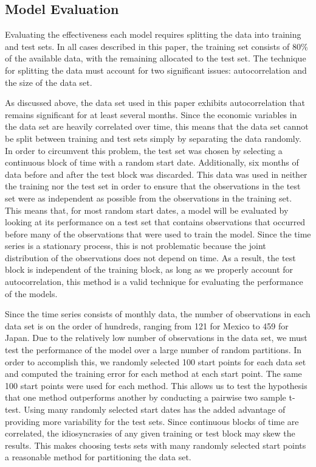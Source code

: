 \documentclass{sig-alternate-05-2015}
\begin{document}
\subsection{Model Evaluation}
Evaluating the effectiveness each model requires splitting the data into training and test sets. In all cases described in this paper, the training set consists of 80\% of the available data, with the remaining allocated to the test set. The technique for splitting the data must account for two significant issues: autocorrelation and the size of the data set.
\par{} As discussed above, the data set used in this paper exhibits autocorrelation that remains significant for at least several months. Since the economic variables in the data set are heavily correlated over time, this means that the data set cannot be split between training and test sets simply by separating the data randomly. In order to circumvent this problem, the test set was chosen by selecting a continuous block of time with a random start date. Additionally, six months of data before and after the test block was discarded. This data was used in neither the training nor the test set in order to ensure that the observations in the test set were as independent as possible from the observations in the training set. This means that, for most random start dates, a model will be evaluated by looking at its performance on a test set that contains observations that occurred before many of the observations that were used to train the model. Since the time series is a stationary process, this is not problematic because the joint distribution of the observations does not depend on time. As a result, the test block is independent of the training block, as long as we properly account for autocorrelation, this method is a valid technique for evaluating the performance of the models.
\par{} Since the time series consists of monthly data, the number of observations in each data set is on the order of hundreds, ranging from 121 for Mexico to 459 for Japan. Due to the relatively low number of observations in the data set, we must test the performance of the model over a large number of random partitions. In order to accomplish this, we randomly selected 100 start points for each data set and computed the training error for each method at each start point. The same 100 start points were used for each method. This allows us to test the hypothesis that one method outperforms another by conducting a pairwise two sample t-test. Using many randomly selected start dates has the added advantage of providing more variability for the test sets. Since continuous blocks of time are correlated, the idiosyncrasies of any given training or test block may skew the results. This makes choosing tests sets with many randomly selected start points a reasonable method for partitioning the data set.
\end{document}
